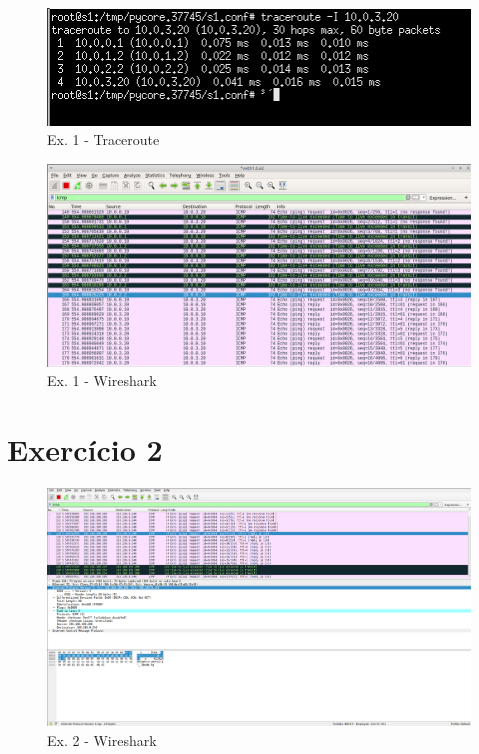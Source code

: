 \documentclass[a4paper]{report}
\begin{document}
\begin{figure}[H]
    \centering 
    \includegraphics[width=\textwidth]{images/traceroutEx1.png}  
    \caption{Ex. 1 - Traceroute}
    \label{fig:traceroutEx1}
\end{figure}

\begin{figure}[H]
    \centering 
    \includegraphics[width=\textwidth]{images/wiresharkEx1.png}  
    \caption{Ex. 1 - Wireshark}
    \label{fig:wiresharkEx1}
\end{figure}

\pagebreak
\section{Exercício 2}

\begin{figure}[H]
    \centering 
    \includegraphics[width=\textwidth]{images/wiresharkEx2.png}  
    \caption{Ex. 2 - Wireshark}
    \label{fig:wiresharkEx2}
\end{figure}
\end{document}
